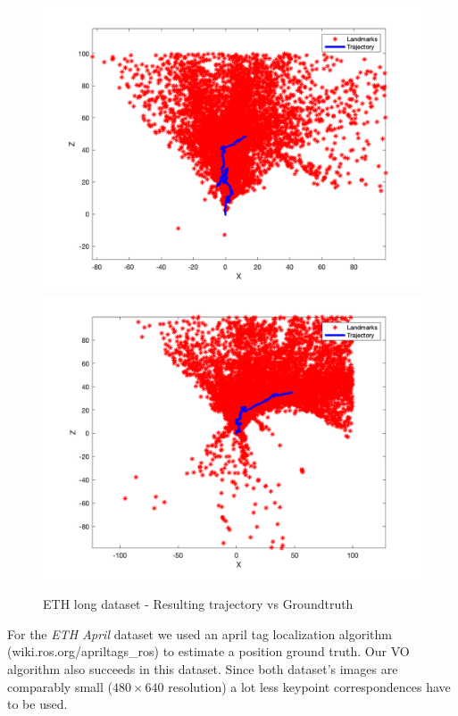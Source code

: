 \documentclass[letterpaper, 12 pt]{article}
\begin{document}
\begin{multicols*}{2}
\begin{figure}[H]
\begin{center}
\includegraphics[width=\linewidth]{eth_long.png}
\includegraphics[width=\linewidth]{eth_long2.png}
\end{center}
\caption{ETH long dataset - Resulting trajectory vs Groundtruth}
\label{fig:results_eth_long}
\end{figure}

 For the \textit{ETH April} dataset we used an april tag localization algorithm (wiki.ros.org/apriltags\_ros) to estimate a position ground truth. Our VO algorithm also succeeds in this dataset. Since both dataset's images are comparably small ($480\times 640$ resolution) a lot less keypoint correspondences have to be used. 


\end{multicols*}
\end{document}
